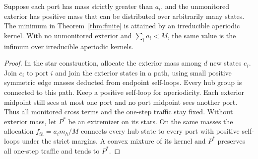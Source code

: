 \begin{proposition}\label{prop:connected}
Suppose each port has mass strictly greater than \(a_i\), and the unmonitored exterior has positive mass that can be distributed over arbitrarily many states. The minimum in Theorem~\ref{thm:finite} is attained by an irreducible aperiodic kernel. With no unmonitored exterior and \(\sum_i a_i<M\), the same value is the infimum over irreducible aperiodic kernels.
\end{proposition}
\begin{proof}
In the star construction, allocate the exterior mass among \(d\) new states \(e_i\). Join \(e_i\) to port \(i\) and join the exterior states in a path, using small positive symmetric edge masses deducted from endpoint self-loops. Every hub group is connected to this path. Keep a positive self-loop for aperiodicity. Each exterior midpoint still sees at most one port and no port midpoint sees another port. Thus all monitored cross terms and the one-step traffic stay fixed. Without exterior mass, let \(P^*\) be an extremizer on its stars. On the same masses the allocation \(f_{ih}=a_i m_h/M\) connects every hub state to every port with positive self-loops under the strict margins. A convex mixture of its kernel and \(P^*\) preserves all one-step traffic and tends to \(P^*\).
\end{proof}
